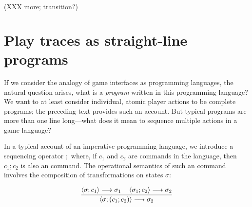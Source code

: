   (XXX more; transition?)
% 

  
  

  \section{Play traces as straight-line programs}
  

    If we consider the analogy of game interfaces as programming languages,
    the natural question arises, what is a {\em program} written in this
    programming language? We want to at least consider individual, atomic
    player actions to be complete programs; the preceding text provides
    such an account. But typical programs are more than one line
    long---what does it mean to sequence multiple actions in a game
    language?

    In a typical account of an imperative programming language, we
    introduce a sequencing operator $;$ where, if $c_1$ and $c_2$ are
    commands in the language, then $c_1;c_2$ is also an command.
    The operational semantics of such an command involves the
    composition of transformations on states $\sigma$:

    \[
      \infer{
        \left< \sigma; (c_1;c_2)\right> \longrightarrow
        \sigma_2
      }
      {
        \left<\sigma; c_1 \right> \longrightarrow
          \sigma_1
        \quad
        \left<\sigma_1; c_2 \right> \longrightarrow
          \sigma_2
      }
    \]

